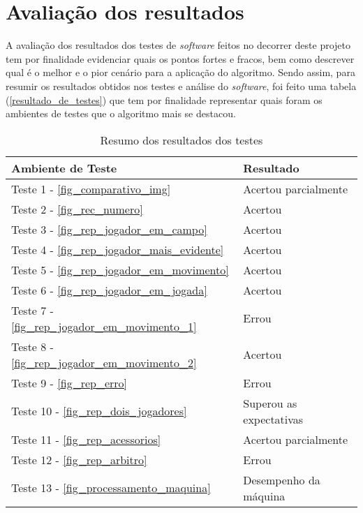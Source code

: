 \section{\textbf{Avaliação dos resultados}}
\label{ref_avaliacao_dos_resultados}

A avaliação dos resultados dos testes de \textit{software} feitos no decorrer deste projeto tem por finalidade evidenciar quais os pontos fortes e fracos, bem como descrever qual é o melhor e o pior cenário para a aplicação do algoritmo. Sendo assim, para resumir os resultados obtidos nos testes e análise do \textit{software}, foi feito uma tabela (\autoref{resultado_de_testes}) que tem por finalidade representar quais foram os ambientes de testes que o algoritmo mais se destacou.

\begin{table}[h]
\centering
\caption{Resumo dos resultados dos testes}
\label{resultado_de_testes}
\begin{tabular}{l|l} 
\hline
\hline
\multicolumn{1}{l|}{\textbf{Ambiente de Teste}} & \multicolumn{1}{l}{\textbf{Resultado}}  \\ 
\hline
\centering
Teste 1 - \autoref{fig_comparativo_img} & Acertou parcialmente\\
Teste 2 - \autoref{fig_rec_numero} & Acertou\\
Teste 3 - \autoref{fig_rep_jogador_em_campo} & Acertou\\
Teste 4 - \autoref{fig_rep_jogador_mais_evidente} & Acertou\\
Teste 5 - \autoref{fig_rep_jogador_em_movimento} & Acertou\\
Teste 6 - \autoref{fig_rep_jogador_em_jogada} & Acertou\\
Teste 7 - \autoref{fig_rep_jogador_em_movimento_1} & Errou\\
Teste 8 - \autoref{fig_rep_jogador_em_movimento_2} & Acertou\\
Teste 9 - \autoref{fig_rep_erro} & Errou\\
Teste 10 - \autoref{fig_rep_dois_jogadores} & Superou as expectativas\\
Teste 11 - \autoref{fig_rep_acessorios} & Acertou parcialmente\\
Teste 12 - \autoref{fig_rep_arbitro} & Errou\\
Teste 13 - \autoref{fig_processamento_maquina} & Desempenho da máquina\\
\hline
\hline 
\end{tabular}
\end{table}